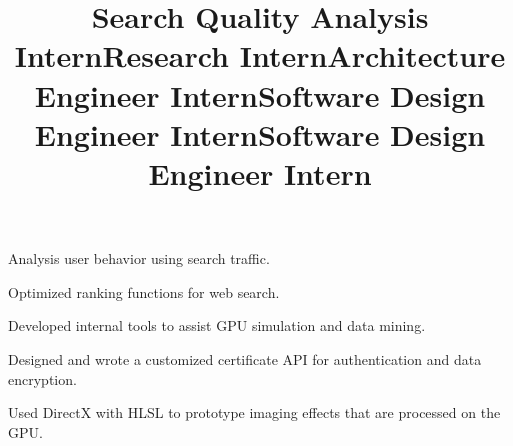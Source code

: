 \begin{resume}
\title{Search Quality Analysis Intern}
\begin{position}
Analysis user behavior using search traffic.
\end{position}

\title{Research Intern}
\begin{position}
Optimized ranking functions for web search.
\end{position}

\title{Architecture Engineer Intern}
\begin{position}
Developed internal tools to assist GPU simulation and data mining.  
\end{position}

\title{Software Design Engineer Intern}
\begin{position}
Designed and wrote a customized certificate API for authentication
and data encryption.
\end{position}

\title{Software Design Engineer Intern}
\begin{position}
Used DirectX with HLSL to prototype imaging effects that are
processed on the GPU.
\end{position}







\end{resume}
